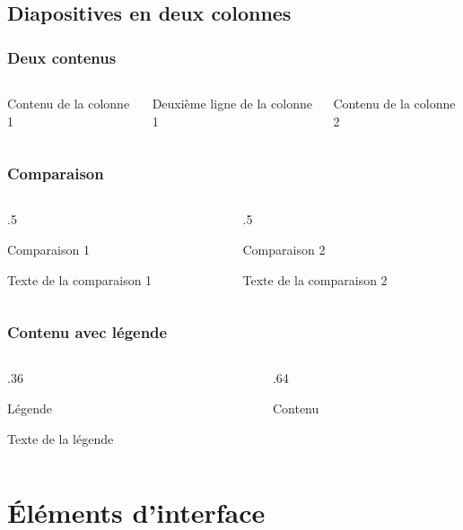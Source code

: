\documentclass[aspectratio=1610,compress,t,english,french]{hecppt}
\newenvironment{HECcomparaison}[1]{%
	\begin{column}[t]{.5\textwidth}
		\vspace{-7mm}		
		\begin{block}{#1}
}{%
		\end{block}
	\end{column}
}
\newenvironment{HEClegende}[1]{%
	\begin{column}[t]{.36\textwidth}
		\vspace{-7mm}
		\begin{block}{#1}
}{%
		\end{block}
	\end{column}
}
\newenvironment{HECcontenuLegende}{%
	\begin{column}[t]{.64\textwidth}
		\vspace{-7mm}
}{%
	\end{column}
}
\begin{document}
\subsection{Diapositives en deux colonnes}

\begin{frame}
	\frametitle{Deux contenus}
	\begin{columns}
			Contenu de la colonne 1
			
			Deuxième ligne de la colonne 1
			
			Contenu de la colonne 2
	\end{columns}
\end{frame}

\begin{frame}
\frametitle{Comparaison}
\begin{columns}
	\begin{HECcomparaison}{Comparaison 1}
		Texte de la comparaison 1
	\end{HECcomparaison}

	\begin{HECcomparaison}{Comparaison 2}
		Texte de la comparaison 2
	\end{HECcomparaison}
\end{columns}
\end{frame}

\begin{frame}
\frametitle{Contenu avec légende}
\begin{columns}
	\begin{HEClegende}{Légende}
		Texte de la légende
	\end{HEClegende}
	\begin{HECcontenuLegende}
		Contenu
	\end{HECcontenuLegende}
\end{columns}
\end{frame}

\section{Éléments d'interface}
\hypertarget{elementsInterface}{}
\end{document}
